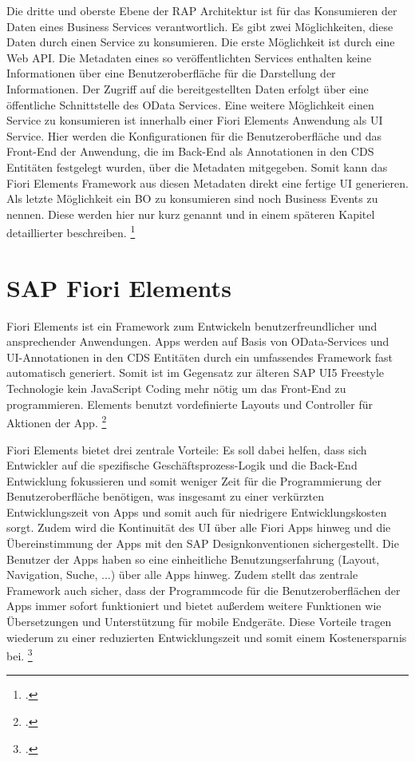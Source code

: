 Die dritte und oberste Ebene der RAP Architektur ist für das Konsumieren der Daten eines Business Services verantwortlich. Es gibt zwei Möglichkeiten, diese Daten durch einen Service zu konsumieren. Die erste Möglichkeit ist durch eine Web API. Die Metadaten eines so veröffentlichten Services enthalten keine Informationen über eine Benutzeroberfläche für die Darstellung der Informationen. Der Zugriff auf die bereitgestellten Daten erfolgt über eine öffentliche Schnittstelle des OData Services. Eine weitere Möglichkeit einen Service zu konsumieren ist innerhalb einer Fiori Elements Anwendung als UI Service. Hier werden die Konfigurationen für die Benutzeroberfläche und das Front-End der Anwendung, die im Back-End als Annotationen in den CDS Entitäten festgelegt wurden, über die Metadaten mitgegeben. Somit kann das Fiori Elements Framework aus diesen Metadaten direkt eine fertige UI generieren. Als letzte Möglichkeit ein BO zu konsumieren sind noch Business Events zu nennen. Diese werden hier nur kurz genannt und in einem späteren Kapitel detaillierter beschreiben. \footcite[Vgl.][]{sap_rap_2023}

\section{SAP Fiori Elements}

Fiori Elements ist ein Framework zum Entwickeln benutzerfreundlicher und ansprechender Anwendungen. Apps werden auf Basis von OData-Services und UI-Annotationen in den CDS Entitäten durch ein umfassendes Framework fast automatisch generiert. Somit ist im Gegensatz zur älteren SAP UI5 Freestyle Technologie kein JavaScript Coding mehr nötig um das Front-End zu programmieren. Elements benutzt vordefinierte Layouts und Controller für Aktionen der App. \footcite[Vgl.][]{sap_ui5-docu_2022}

Fiori Elements bietet drei zentrale Vorteile: Es soll dabei helfen, dass sich Entwickler auf die spezifische Geschäftsprozess-Logik und die Back-End Entwicklung fokussieren und somit weniger Zeit für die Programmierung der Benutzeroberfläche benötigen, was insgesamt zu einer verkürzten Entwicklungszeit von Apps und somit auch für niedrigere Entwicklungskosten sorgt. Zudem wird die Kontinuität des UI über alle Fiori Apps hinweg und die Übereinstimmung der Apps mit den SAP Designkonventionen sichergestellt. Die Benutzer der Apps haben so eine einheitliche Benutzungserfahrung (Layout, Navigation, Suche, ...) über alle Apps hinweg. Zudem stellt das zentrale Framework auch sicher, dass der Programmcode für die Benutzeroberflächen der Apps immer sofort funktioniert und bietet au{\ss}erdem weitere Funktionen wie Übersetzungen und Unterstützung für mobile Endgeräte. Diese Vorteile tragen wiederum zu einer reduzierten Entwicklungszeit und somit einem Kostenersparnis bei. \footcite[Vgl.][]{sap_ui5-docu_2022}

